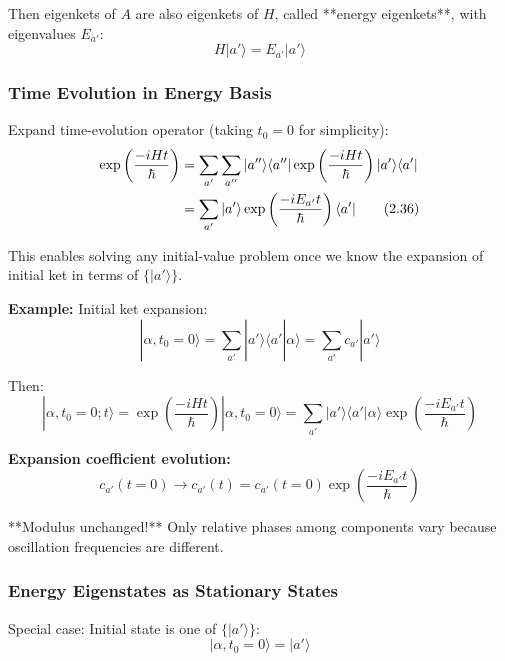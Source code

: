\documentclass[11pt,a4paper]{article}
\begin{document}
Then eigenkets of $A$ are also eigenkets of $H$, called **energy eigenkets**, with eigenvalues $E_{a'}$:
\begin{equation}
H|a'\rangle = E_{a'}|a'\rangle
\tag{2.35}
\end{equation}

\subsubsection{Time Evolution in Energy Basis}

Expand time-evolution operator (taking $t_0 = 0$ for simplicity):
\begin{align}
\exp\left(\frac{-iHt}{\hbar}\right) &= \sum_{a'}\sum_{a''}|a''\rangle\langle a''|\exp\left(\frac{-iHt}{\hbar}\right)|a'\rangle\langle a'| \notag \\
&= \sum_{a'}|a'\rangle\exp\left(\frac{-iE_{a'}t}{\hbar}\right)\langle a'|
\tag{2.36}
\end{align}

This enables solving any initial-value problem once we know the expansion of initial ket in terms of $\{|a'\rangle\}$.

\textbf{Example:} Initial ket expansion:
\begin{equation}
|\alpha, t_0 = 0\rangle = \sum_{a'}|a'\rangle\langle a'|\alpha\rangle = \sum_{a'}c_{a'}|a'\rangle
\tag{2.37}
\end{equation}

Then:
\begin{equation}
|\alpha, t_0 = 0; t\rangle = \exp\left(\frac{-iHt}{\hbar}\right)|\alpha, t_0 = 0\rangle = \sum_{a'}|a'\rangle\langle a'|\alpha\rangle\exp\left(\frac{-iE_{a'}t}{\hbar}\right)
\tag{2.38}
\end{equation}

\textbf{Expansion coefficient evolution:}
\begin{equation}
\boxed{c_{a'}(t = 0) \to c_{a'}(t) = c_{a'}(t = 0)\exp\left(\frac{-iE_{a'}t}{\hbar}\right)}
\tag{2.39}
\end{equation}

**Modulus unchanged!** Only relative phases among components vary because oscillation frequencies are different.

\subsubsection{Energy Eigenstates as Stationary States}

Special case: Initial state is one of $\{|a'\rangle\}$:
\begin{equation}
|\alpha, t_0 = 0\rangle = |a'\rangle
\tag{2.40}
\end{equation}
\end{document}

